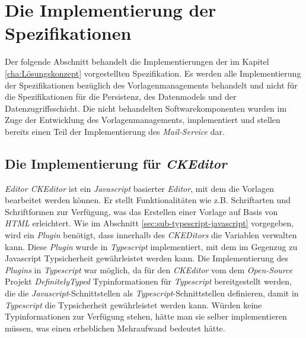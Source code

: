 \section{Die Implementierung der Spezifikationen}
Der folgende Abschnitt behandelt die Implementierungen der im Kapitel \ref{cha:Lösungskonzept} vorgestellten Spezifikation. Es werden alle Implementierung der Spezifikationen bezüglich des Vorlagenmanagements behandelt und nicht für die Spezifikationen für die Persistenz, des Datenmodels und der Datenzugriffsschicht. Die nicht behandelten Softwarekomponenten wurden im Zuge der Entwicklung des Vorlagenmanagements, implementiert und stellen bereits einen Teil der Implementierung des \emph{Mail-Service} dar.

\subsection{Die Implementierung für \emph{CKEditor}}
\emph{Editor CKEditor} ist ein \emph{Javascript} basierter \emph{Editor}, mit dem die Vorlagen bearbeitet werden können. Er stellt Funktionalitäten wie z.B. Schriftarten und Schriftformen
zur Verfügung, was das Erstellen einer Vorlage auf Basis von \emph{HTML} erleichtert. Wie im Abschnitt \ref{sec:sub-typescript-javascript} vorgegeben, wird ein \emph{Plugin} benötigt, dass innerhalb des \emph{CKEDitors} die Variablen verwalten kann. Diese \emph{Plugin} wurde in \emph{Typescript} implementiert, mit dem im Gegenzug zu Javascript Typsicherheit gewährleistet werden kann. Die Implementierung des \emph{Plugins} in \emph{Typescript} war möglich, da für den \emph{CKEditor} vom dem \emph{Open-Source} Projekt \emph{DefinitelyTyped} Typinformationen für \emph{Typescript} bereitgestellt werden, die die \emph{Javascript}-Schnittstellen als \emph{Typescript}-Schnittstellen definieren, damit in \emph{Typescript} die Typsicherheit gewährleistet werden kann. Würden keine Typinformationen zur Verfügung stehen, hätte man sie selber implementieren müssen, was einen erheblichen Mehraufwand bedeutet hätte.
 

